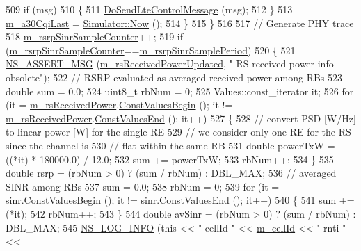 \begin{DoxyCode}
509           \textcolor{keywordflow}{if} (msg)
510             \{
511               \hyperlink{classns3_1_1LteUePhy_aec15b282a5036f328c1e8ca6222b6b13}{DoSendLteControlMessage} (msg);
512             \}
513           \hyperlink{classns3_1_1LteUePhy_a912b9e3767497522b16d68e3602ec0a3}{m\_a30CqiLast} = \hyperlink{classns3_1_1Simulator_ac3178fa975b419f7875e7105be122800}{Simulator::Now} ();
514         \}
515     \}
516 
517   \textcolor{comment}{// Generate PHY trace}
518   \hyperlink{classns3_1_1LteUePhy_a1b0a01c9da8427095d325cc12b0cdccb}{m\_rsrpSinrSampleCounter}++;
519   \textcolor{keywordflow}{if} (\hyperlink{classns3_1_1LteUePhy_a1b0a01c9da8427095d325cc12b0cdccb}{m\_rsrpSinrSampleCounter}==\hyperlink{classns3_1_1LteUePhy_a850c3c3e0a9f23f2907a2a6647a23f84}{m\_rsrpSinrSamplePeriod})
520     \{
521       \hyperlink{assert_8h_aff5ece9066c74e681e74999856f08539}{NS\_ASSERT\_MSG} (\hyperlink{classns3_1_1LteUePhy_abd50d8b4eab7a7dd0cb44267d4cb982d}{m\_rsReceivedPowerUpdated}, \textcolor{stringliteral}{" RS received power
       info obsolete"});
522       \textcolor{comment}{// RSRP evaluated as averaged received power among RBs}
523       \textcolor{keywordtype}{double} sum = 0.0;
524       uint8\_t rbNum = 0;
525       Values::const\_iterator it;
526       \textcolor{keywordflow}{for} (it = \hyperlink{classns3_1_1LteUePhy_a6ed253b11e81be61b177836490e4d07b}{m\_rsReceivedPower}.\hyperlink{classns3_1_1SpectrumValue_aad6900431bd0554b3ba9a00691c2393b}{ConstValuesBegin} (); it != 
      \hyperlink{classns3_1_1LteUePhy_a6ed253b11e81be61b177836490e4d07b}{m\_rsReceivedPower}.\hyperlink{classns3_1_1SpectrumValue_ab5c2fbde4e06be7c0e4d7a0755c607be}{ConstValuesEnd} (); it++)
527         \{
528           \textcolor{comment}{// convert PSD [W/Hz] to linear power [W] for the single RE}
529           \textcolor{comment}{// we consider only one RE for the RS since the channel is }
530           \textcolor{comment}{// flat within the same RB }
531           \textcolor{keywordtype}{double} powerTxW = ((*it) * 180000.0) / 12.0;
532           sum += powerTxW;
533           rbNum++;
534         \}
535       \textcolor{keywordtype}{double} rsrp = (rbNum > 0) ? (sum / rbNum) : DBL\_MAX;
536       \textcolor{comment}{// averaged SINR among RBs}
537       sum = 0.0;
538       rbNum = 0;
539       \textcolor{keywordflow}{for} (it = sinr.ConstValuesBegin (); it != sinr.ConstValuesEnd (); it++)
540         \{
541           sum += (*it);
542           rbNum++;
543         \}
544       \textcolor{keywordtype}{double} avSinr = (rbNum > 0) ? (sum / rbNum) : DBL\_MAX;
545       \hyperlink{group__logging_gafbd73ee2cf9f26b319f49086d8e860fb}{NS\_LOG\_INFO} (\textcolor{keyword}{this} << \textcolor{stringliteral}{" cellId "} << \hyperlink{classns3_1_1LtePhy_ac53d10d27f1bde64807a3ff366662787}{m\_cellId} << \textcolor{stringliteral}{" rnti "} << 

\end{DoxyCode}
